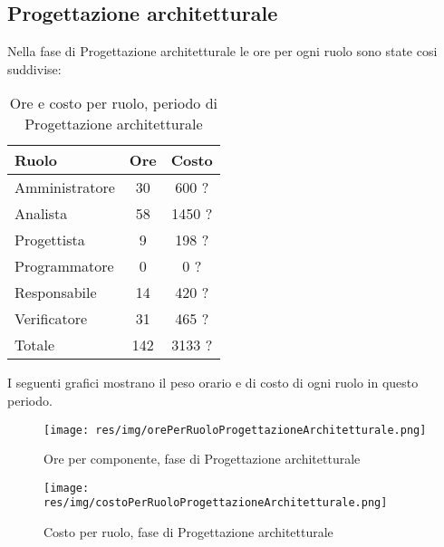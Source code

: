 \subsection{Progettazione architetturale}
Nella fase di Progettazione architetturale le ore per ogni ruolo sono state cosi suddivise:

\begin{table}[H]
	\centering
	\begin{tabular}{ l c c }
		\textbf{Ruolo} & \textbf{Ore} & \textbf{Costo} \\
		\hline
		Amministratore & 30 & 600 ? \\
		Analista & 58 & 1450 ? \\
		Progettista & 9 & 198 ? \\
		Programmatore & 0 & 0 ? \\
		Responsabile & 14 & 420 ? \\
		Verificatore & 31 & 465 ? \\
		\hline
		Totale & 142 & 3133 ? \\
		\hline
	\end{tabular}
	\caption{Ore e costo per ruolo, periodo di Progettazione architetturale}
\end{table}

I seguenti grafici mostrano il peso orario e di costo di ogni ruolo in questo periodo.

\begin{figure}[H]
  \begin{center}
    \texttt{[image: res/img/orePerRuoloProgettazioneArchitetturale.png]}
  \caption{Ore per componente, fase di Progettazione architetturale}
  \end{center} 
\end{figure}  

\begin{figure}[H]
  \begin{center}
    \texttt{[image: res/img/costoPerRuoloProgettazioneArchitetturale.png]}
  \caption{Costo per ruolo, fase di Progettazione architetturale}
  \end{center} 
\end{figure}  


